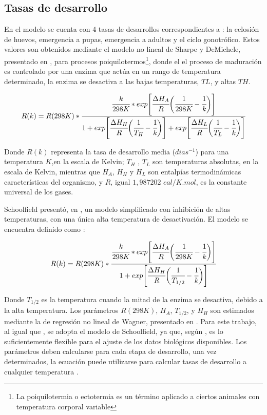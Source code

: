 \subsection{Tasas de desarrollo}
\label{subsec:cap4-tasas de desarrollo}
En el modelo se cuenta con 4 tasas de desarrollos correspondientes a : la eclosión de huevos,
emergencia a pupas, emergencia a adultos y el ciclo gonotrófico. Estos valores son obtenidos
mediante el modelo no lineal de Sharpe y DeMichele, presentado en \cite{sharpe1977reaction}, para procesos poiquilotermos\footnote{ La poiquilotermia o ectotermia es un término aplicado a ciertos
animales con temperatura corporal variable}, donde el el proceso de maduración es controlado por
una enzima que actúa en un rango de temperatura determinado, la enzima se desactiva a las bajas temperaturas, $TL$, y altas $TH$.

\begin{equation} \label{eq:sharpe-demichele}
   R(k)  = R(298K) *\cfrac{ \cfrac{k}{298K} *
    exp \Bigg[
            \cfrac{\Delta H_{A}}{R} \bigg(\cfrac{1}{298K} - \cfrac{1}{k}\bigg)
        \Bigg]}
    {1 + exp\Bigg[\cfrac{\Delta H_{H}}{R} \bigg(\cfrac{1}{T_{H}}- \cfrac{1}{k}\bigg)\Bigg] +  exp\Bigg[\cfrac{\Delta H_{L}}{R} \bigg(\cfrac{1}{T_{L}}- \cfrac{1}{k}\bigg)\Bigg]}
\end{equation}

Donde $R(k)$ representa la tasa de desarrollo media ($dias^{-1}$) para una temperatura $K$,en la
escala de Kelvin; $T_{H}$ , $T_{L}$ son temperaturas absolutas, en la escala de Kelvin, mientras
que $H_{A}$, $H_{H}$ y $H_{L}$ son entalpías termodinámicas características del organismo, y $R$,
igual $1,987202$ $cal/K.mol$, es la constante universal de los gases.

Schoolfield presentó, en \cite{schoolfield1981non}, un modelo simplificado con inhibición de altas
temperaturas, con una única alta temperatura de desactivación. El modelo se encuentra definido
como :

\begin{equation} \label{eq:schoolfield}
   R(k)  = R(298K) *\cfrac{ \cfrac{k}{298K} *
    exp \Bigg[
            \cfrac{\Delta H_{A}}{R} \bigg(\cfrac{1}{298K} - \cfrac{1}{k}\bigg)
        \Bigg]}
    {1 + exp\Bigg[\cfrac{\Delta H_{H}}{R} \bigg(\cfrac{1}{T_{1/2}}- \cfrac{1}{k}\bigg)\Bigg] }
\end{equation}

Donde $T_{1/2}$ es la temperatura cuando la mitad de la enzima se desactiva, debido a la alta
temperatura. Los parámetros $R(298K)$, $H_{A}$, $T_{1/2}$, y $H_{H}$ son estimados mediante la
de regresión no lineal de Wagner, presentado en \cite{wagner1984modeling}. Para este trabajo,
al igual que \cite{rueda1990temperature, otero2006stochastic}, se adopta el modelo de Schoolfield,
ya que, según \cite{otero2006stochastic}, es lo suficientemente flexible para el ajuste de los
datos biológicos disponibles. Los parámetros deben calcularse para cada etapa de desarrollo, una
vez determinados, la ecuación puede utilizarse para calcular tasas de desarrollo a cualquier
temperatura \cite{rueda1990temperature}.
